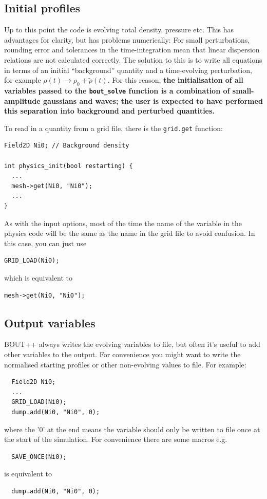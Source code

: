\documentclass[12pt]{article}
\newcommand{\code}[1]{\texttt{#1}}
\begin{document}
\subsection{Initial profiles}
Up to this point the code is evolving total density, pressure etc. This has advantages for clarity,
but has problems numerically: For small perturbations, rounding error and tolerances in the time-integration
mean that linear dispersion relations are not calculated correctly. The solution to this
is to write all equations in terms of an initial ``background'' quantity and a time-evolving
perturbation, for example $\rho\left(t\right) \rightarrow \rho_0 + \tilde{\rho}\left(t\right)$.
For this reason, {\bf the initialisation of all variables passed to the \code{bout\_solve} function
is a combination of small-amplitude gaussians and waves; the user is expected to have performed this
separation into background and perturbed quantities.} 

To read in a quantity from a grid file, there is the \code{grid.get} function:

\begin{lstlisting}
Field2D Ni0; // Background density

int physics_init(bool restarting) {
  ...
  mesh->get(Ni0, "Ni0");
  ...
}
\end{lstlisting}

As with the input options, most of the time the name of the variable in the
physics code will be the same as the name in the grid file to avoid confusion.
In this case, you can just use 
\begin{lstlisting}
GRID_LOAD(Ni0);
\end{lstlisting}
which is equivalent to
\begin{lstlisting}
mesh->get(Ni0, "Ni0");
\end{lstlisting}

\subsection{Output variables}
BOUT++ always writes the evolving variables to file, but often it's useful to add other variables
to the output. For convenience you might want to write the normalised starting profiles or other
non-evolving values to file. For example:
\begin{lstlisting}
  Field2D Ni0;
  ...
  GRID_LOAD(Ni0);
  dump.add(Ni0, "Ni0", 0); 
\end{lstlisting}
where the '0' at the end means the variable should only be written to file once at the start of the
simulation. For convenience there are some macros e.g. 
\begin{lstlisting}
  SAVE_ONCE(Ni0); 
\end{lstlisting}
is equivalent to
\begin{lstlisting}
  dump.add(Ni0, "Ni0", 0); 
\end{lstlisting}
\end{document}
